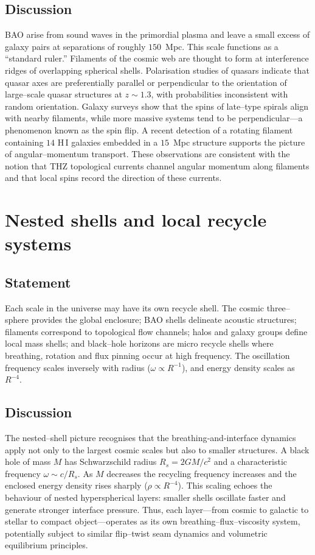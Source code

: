 \documentclass{article}
\begin{document}
\subsection{Discussion}
BAO arise from sound waves in the primordial plasma and leave a small excess of galaxy pairs at separations of roughly $150$~Mpc.  This scale functions as a ``standard ruler.''  Filaments of the cosmic web are thought to form at interference ridges of overlapping spherical shells.  Polarisation studies of quasars indicate that quasar axes are preferentially parallel or perpendicular to the orientation of large–scale quasar structures at $z\sim1.3$, with probabilities inconsistent with random orientation.  Galaxy surveys show that the spins of late–type spirals align with nearby filaments, while more massive systems tend to be perpendicular—a phenomenon known as the spin flip.  A recent detection of a rotating filament containing $14$ H\,I galaxies embedded in a $15$~Mpc structure supports the picture of angular–momentum transport.  These observations are consistent with the notion that THZ topological currents channel angular momentum along filaments and that local spins record the direction of these currents.

\section{Nested shells and local recycle systems}
\label{sec:nested}
\subsection{Statement}
Each scale in the universe may have its own recycle shell.  The cosmic three–sphere provides the global enclosure; BAO shells delineate acoustic structures; filaments correspond to topological flow channels; halos and galaxy groups define local mass shells; and black–hole horizons are micro recycle shells where breathing, rotation and flux pinning occur at high frequency.  The oscillation frequency scales inversely with radius ($\omega \propto R^{-1}$), and energy density scales as $R^{-4}$.

\subsection{Discussion}
The nested–shell picture recognises that the breathing‐and‐interface dynamics apply not only to the largest cosmic scales but also to smaller structures.  A black hole of mass $M$ has Schwarzschild radius $R_s=2GM/c^2$ and a characteristic frequency $\omega\sim c/R_s$.  As $M$ decreases the recycling frequency increases and the enclosed energy density rises sharply ($\rho\propto R^{-4}$).  This scaling echoes the behaviour of nested hyperspherical layers: smaller shells oscillate faster and generate stronger interface pressure.  Thus, each layer—from cosmic to galactic to stellar to compact object—operates as its own breathing–flux–viscosity system, potentially subject to similar flip–twist seam dynamics and volumetric equilibrium principles.
\end{document}
